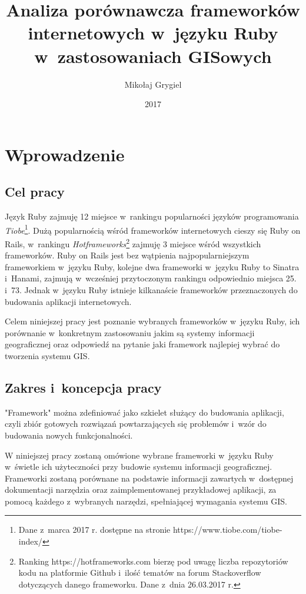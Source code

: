 \documentclass[archivemode]{mgr}
\date{2017}
\title{Analiza porównawcza frameworków internetowych w~języku Ruby w~zastosowaniach GISowych}
\author{Mikołaj Grygiel}
\begin{document}


\maketitle

\tableofcontents

\chapter{Wprowadzenie}
\section{Cel pracy}
Język Ruby zajmuję 12 miejsce w~rankingu popularności języków programowania \emph{Tiobe}\footnote{Dane z~marca 2017 r. dostępne na stronie https://www.tiobe.com/tiobe-index/}. Dużą popularnością wśród frameworków internetowych cieszy się Ruby on Rails, w~rankingu \emph{Hotframeworks}\footnote{Ranking https://hotframeworks.com bierzę pod uwagę liczba repozytoriów kodu na platformie Github i~ilość tematów na forum Stackoverflow dotyczących danego frameworku. Dane z~dnia 26.03.2017 r.} zajmuję 3 miejsce wśród wszystkich frameworków. Ruby on Rails jest bez wątpienia najpopularniejszym frameworkiem w~języku Ruby, kolejne dwa frameworki w~języku Ruby to Sinatra i~Hanami, zajmują w~wcześniej przytoczonym rankingu odpowiednio miejsca 25. i~73. Jednak w~języku Ruby istnieje kilkanaście frameworków przeznaczonych do budowania aplikacji internetowych.

Celem niniejszej pracy jest poznanie wybranych frameworków w~języku Ruby, ich porównanie w~konkretnym zastosowaniu jakim są systemy informacji geograficznej oraz odpowiedź na pytanie jaki framework najlepiej wybrać do tworzenia systemu GIS.

\section{Zakres i~koncepcja pracy}
"Framework" można zdefiniować jako szkielet służący do budowania aplikacji, czyli zbiór gotowych rozwiązań powtarzających się problemów i~wzór do budowania nowych funkcjonalności. \cite{framework}

W niniejszej pracy zostaną omówione wybrane frameworki w~języku Ruby w~świetle ich użyteczności przy budowie systemu informacji geograficznej. Frameworki zostaną porównane na podstawie informacji zawartych w~dostępnej dokumentacji narzędzia oraz zaimplementowanej przykładowej aplikacji, za pomocą każdego z~wybranych narzędzi, spełniającej wymagania systemu GIS.
\end{document}
